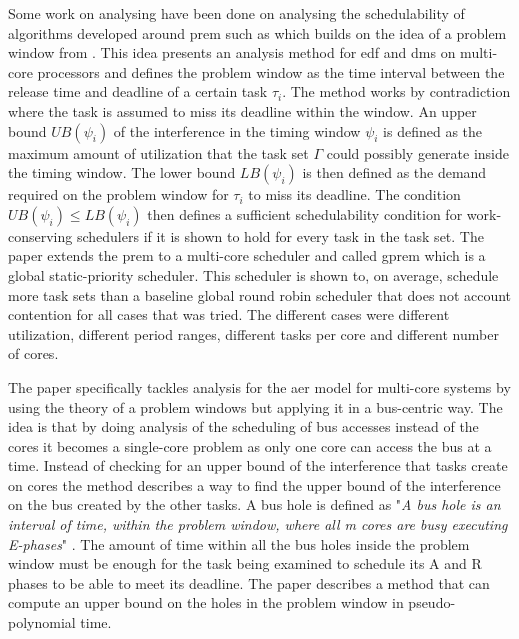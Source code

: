 \documentclass{kththesis}
\begin{document}
Some work on analysing have been done on analysing the schedulability of algorithms developed around
\acrshort{prem} such as \parencite{alhammad_schedulability_2014} which builds on the idea of a
problem window from \parencite{baker_multiprocessor_2003}. This idea presents an analysis method for
\acrshort{edf} and \acrshort{dms} on multi-core processors and defines the problem window as the
time interval between the release time and deadline of a certain task $ \tau_i $. The method works
by contradiction where the task is assumed to miss its deadline within the window. An upper bound $
UB(\psi_i) $ of the interference in the timing window $ \psi_i $ is defined as the maximum amount of
utilization that the task set $ \Gamma $ could possibly generate inside the timing window. The lower
bound $ LB(\psi_i) $ is then defined as the demand required on the problem window for $ \tau_i $ to
miss its deadline. The condition $ UB(\psi_i) \le LB(\psi_i) $ then defines a sufficient
schedulability condition for work-conserving schedulers if it is shown to hold for every task in the
task set. The paper extends the \acrshort{prem} to a multi-core scheduler and called
\acrshort{gprem} which is a global static-priority scheduler. This scheduler is shown to, on
average, schedule more task sets than a baseline global round robin scheduler that does not account
contention for all cases that was tried. The different cases were different utilization, different
period ranges, different tasks per core and different number of cores.

The paper \parencite{maia_schedulability_2017} specifically tackles analysis for the \acrshort{aer}
model for multi-core systems by using the theory of a problem windows but applying it in a
bus-centric way. The idea is that by doing analysis of the scheduling of bus accesses instead of the
cores it becomes a single-core problem as only one core can access the bus at a time.  Instead of
checking for an upper bound of the interference that tasks create on cores the method describes a
way to find the upper bound of the interference on the bus created by the other tasks. A bus hole is
defined as "\textit{A bus hole is an interval of time, within the problem window, where all m cores
are busy executing E-phases}" \parencite{maia_schedulability_2017}. The amount of time within all
the bus holes inside the problem window must be enough for the task being examined to schedule its A
and R phases to be able to meet its deadline. The paper describes a method that can compute an upper
bound on the holes in the problem window in pseudo-polynomial time.
\end{document}

